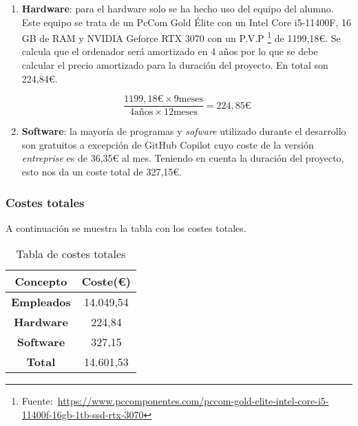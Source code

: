 \begin{enumerate}
Por otro lado el \textit{product owner}, suponiendo un sueldo bruto anual de 39000€\footnote{Fuente:~\url{https://www.glassdoor.es/Sueldos/product-owner-sueldo-SRCH_KO0,13.htm}} , se calcula que el salario bruto hora es de 
21,43€. Teniendo en cuenta que el tutor ha dedicado entorno a 3 horas por semana al proyecto, cobraría 257,16€ brutos al mes. Aplicando la formula al igual que para el desarrollador:
\begin{equation}
\frac{257,16\frac{\text{€}}{mes}}{\text{(1 - (0,236 + 0,067 + 0,002 + 0,006 + 0,015))}} = \text{381,54} \frac{\text{€}}{mes}
\end{equation}
Por lo tanto, y teniendo en cuenta que la duración del proyecto ha sido de 9 meses, el total que ha de pagar la empresa es de 14.049,54€ por los empleados.

\[
381.54\frac{\text{€}}{\text{mes}} \times 9\,\text{meses} + 1179.52\frac{\text{€}}{\text{mes}} \times 9\,\text{meses} = 14049.54\,\text{€}
\]


\item \textbf{Hardware}: para el hardware solo se ha hecho uso del equipo del alumno. Este equipo se trata de un PcCom Gold Élite con un Intel Core i5-11400F, 16 GB de RAM y NVIDIA Geforce RTX 3070 con un P.V.P \footnote{Fuente:~\url{https://www.pccomponentes.com/pccom-gold-elite-intel-core-i5-11400f-16gb-1tb-ssd-rtx-3070}} de 1199,18€. Se calcula que el ordenador será amortizado en 4 años por lo que se debe calcular el precio amortizado para la duración del proyecto. En total son 224,84€.

\[
\frac{1199,18\text{€}\times 9 \text{meses}}{4 \text{años} \times 12 \text{meses}}= 224,85\text{€}
\]

\item \textbf{Software}: la mayoría de programas y \textit{sofware} utilizado durante el desarrollo son gratuitos a excepción de GitHub Copilot cuyo coste de la versión \textit{entreprise} es de 36,35€ al mes. Teniendo en cuenta la duración del proyecto, esto nos da un coste total de 327,15€.

\end{enumerate}

\subsubsection{Costes totales}
A continuación se muestra la tabla con los costes totales.
\begin{table}[ht]
\begin{center}
\begin{tabular}{| c | c |}
	\hline
	\textbf{Concepto} & \textbf{Coste(€)} \\ \hline
	\textbf{Empleados} & 14.049,54 \\
	\textbf{Hardware} & 224,84 \\
	\textbf{Software} & 327,15 \\ \hline
	\hline
	\textbf{Total} & 14.601,53 \\
	\hline
\end{tabular}
\caption{Tabla de costes totales}
\end{center}
\end{table}

